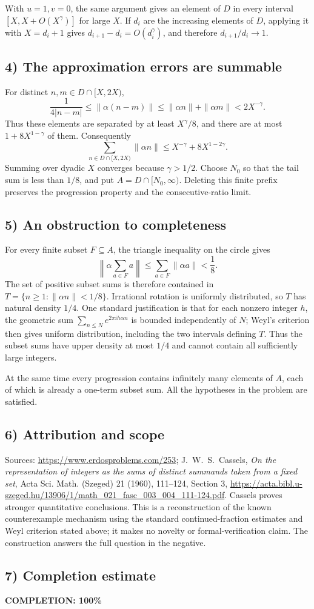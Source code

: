 With $u=1,v=0$, the same argument gives an element of $D$
in every interval $[X,X+O(X^\gamma)]$ for large $X$.
If $d_i$ are the increasing elements of $D$, applying it with
$X=d_i+1$ gives
$d_{i+1}-d_i=O(d_i^\gamma)$, and therefore
$d_{i+1}/d_i\to1$.

\subsection{4) The approximation errors are summable}
For distinct $n,m\in D\cap[X,2X)$,
\[
 \frac1{4|n-m|}
 \leq\|\alpha(n-m)\|
 \leq\|\alpha n\|+\|\alpha m\|<2X^{-\gamma}.
\]
Thus these elements are separated by at least $X^\gamma/8$,
and there are at most $1+8X^{1-\gamma}$ of them.
Consequently
\[
 \sum_{n\in D\cap[X,2X)}\|\alpha n\|
 \leq X^{-\gamma}+8X^{1-2\gamma}.
\]
Summing over dyadic $X$ converges because $\gamma>1/2$.
Choose $N_0$ so that the tail sum is less than $1/8$, and
put $A=D\cap[N_0,\infty)$.
Deleting this finite prefix preserves the progression property
and the consecutive-ratio limit.

\subsection{5) An obstruction to completeness}
For every finite subset $F\subseteq A$, the triangle inequality
on the circle gives
\[
 \left\|\alpha\sum_{a\in F}a\right\|
 \leq\sum_{a\in F}\|\alpha a\|
 <\frac18.
\]
The set of positive subset sums is therefore contained in
$T=\{n\geq1:\|\alpha n\|<1/8\}$.
Irrational rotation is uniformly distributed, so $T$ has
natural density $1/4$. One standard justification is that for
each nonzero integer $h$, the geometric sum
$\sum_{n\leq N}e^{2\pi ih\alpha n}$ is bounded independently
of $N$; Weyl's criterion then gives uniform distribution,
including the two intervals defining $T$.
Thus the subset sums have upper density at most $1/4$ and
cannot contain all sufficiently large integers.

At the same time every progression contains infinitely many
elements of $A$, each of which is already a one-term subset
sum. All the hypotheses in the problem are satisfied.

\subsection{6) Attribution and scope}
Sources: \url{https://www.erdosproblems.com/253};
J.~W.~S.~Cassels, \emph{On the representation of integers as
the sums of distinct summands taken from a fixed set},
Acta Sci. Math. (Szeged) 21 (1960), 111--124, Section 3,
\url{https://acta.bibl.u-szeged.hu/13906/1/math_021_fasc_003_004_111-124.pdf}.
Cassels proves stronger quantitative conclusions. This is a
reconstruction of the known counterexample mechanism using the
standard continued-fraction estimates and Weyl criterion stated
above; it makes no novelty or formal-verification claim.
The construction answers the full question in the negative.
\subsection{7) Completion estimate}
\textbf{COMPLETION: 100\%}
